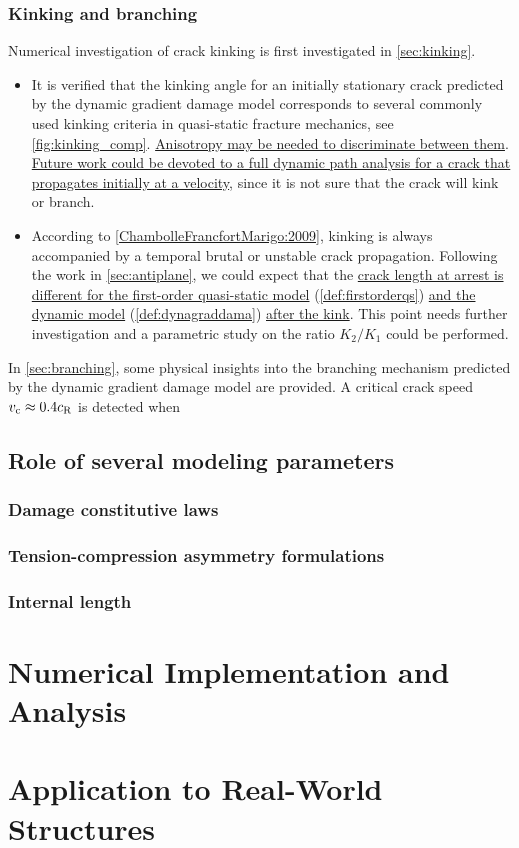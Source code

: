 \subsubsection{Kinking and branching}
Numerical investigation of crack kinking is first investigated in \cref{sec:kinking}.
\begin{itemize}
\item It is verified that the kinking angle for an initially stationary crack predicted by the dynamic gradient damage model corresponds to several commonly used kinking criteria in quasi-static fracture mechanics, see \cref{fig:kinking_comp}. \uline{Anisotropy may be needed to discriminate between them}. \uline{Future work could be devoted to a full dynamic path analysis for a crack that propagates initially at a velocity}, since it is not sure that the crack will kink or branch.
\item According to \cref{ChambolleFrancfortMarigo:2009}, kinking is always accompanied by a temporal brutal or unstable crack propagation. Following the work in \cref{sec:antiplane}, we could expect that the \uline{crack length at arrest is different for the first-order quasi-static model} (\cref{def:firstorderqs}) \uline{and the dynamic model} (\cref{def:dynagraddama}) \uline{after the kink}. This point needs further investigation and a parametric study on the ratio $K_2/K_1$ could be performed.
\end{itemize}

In \cref{sec:branching}, some physical insights into the branching mechanism predicted by the dynamic gradient damage model are provided. A critical crack speed $v_{\mathrm{c}}\approx0.4c_\mathrm{R}$ is detected when

\subsection{Role of several modeling parameters} \label{sec:role}
\subsubsection{Damage constitutive laws}

\subsubsection{Tension-compression asymmetry formulations}

\subsubsection{Internal length}

\section{Numerical Implementation and Analysis} \label{sec:remnum}

\section{Application to Real-World Structures} \label{sec:remconcrete}
